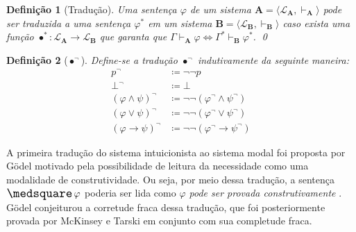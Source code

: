 \documentclass{report}
\newtheorem{definition}{Definição}
\begin{document}
    \begin{definition}[Tradução] 
        Uma sentença $\varphi$ de um sistema $\mathbf{A} = \langle \mathcal{L}_\mathbf{A}, \vdash_\mathbf{A}\rangle$ pode ser traduzida a uma sentença $\varphi^*$ em um sistema $\mathbf{B} = \langle \mathcal{L}_\mathbf{B}, \vdash_\mathbf{B} \rangle$ caso exista uma função $\bullet^* : \mathcal{L}_\mathbf{A} \to \mathcal{L}_\mathbf{B}$ que garanta que $\Gamma \vdash_\mathbf{A} \varphi \Leftrightarrow \Gamma^* \vdash_\mathbf{B} \varphi^*$.
        \qed
    \end{definition}

    \begin{definition}[$\bullet^\neg$] Define-se a tradução $\bullet^\neg$ indutivamente da seguinte maneira:
        \begin{align*}
            p^\neg                     & \coloneqq \neg\neg p                               \\
            \bot^\neg                  & \coloneqq \bot                                     \\
            (\varphi \wedge \psi)^\neg & \coloneqq \neg\neg (\varphi^\neg \wedge \psi^\neg) \\
            (\varphi \vee \psi)^\neg   & \coloneqq \neg\neg (\varphi^\neg \vee \psi^\neg)   \\
            (\varphi \to \psi)^\neg    & \coloneqq \neg\neg (\varphi^\neg \to \psi^\neg)
            \tag*{\qed} 
        \end{align*}
    \end{definition}

    A primeira tradução do sistema intuicionista ao sistema modal foi proposta por Gödel \cite{Gödel} motivado pela possibilidade de leitura da necessidade como uma modalidade de construtividade. Ou seja, por meio dessa tradução, a sentença $\nec \varphi$ poderia ser lida como \textit{$\varphi$ pode ser provada construtivamente} \cite{Troelstra}. Gödel conjeiturou a corretude fraca dessa tradução, que foi posteriormente provada por McKinsey e Tarski \cite{McKinsey} em conjunto com sua completude fraca.
\end{document}
